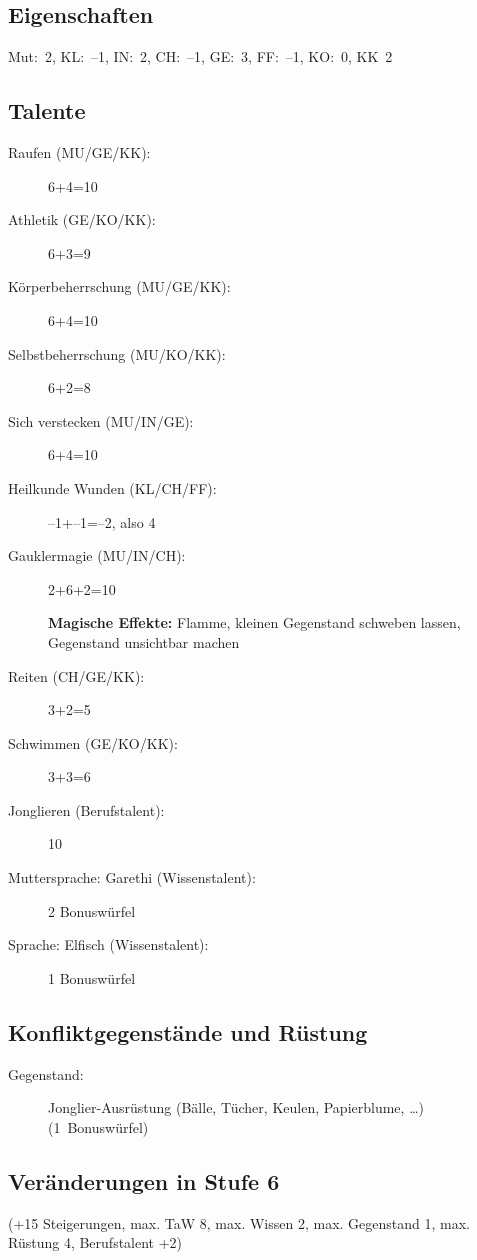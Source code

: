 \subsection{Eigenschaften}
Mut:~2, KL:~--1, IN:~2, CH:~--1, GE:~3, FF:~--1, KO:~0, KK~2

\subsection{Talente}
\begin{description}
\item[Raufen (MU/GE/KK):] 6+4=10
\item[Athletik (GE/KO/KK):] 6+3=9
\item[Körperbeherrschung (MU/GE/KK):] 6+4=10
\item[Selbstbeherrschung (MU/KO/KK):] 6+2=8
\item[Sich verstecken (MU/IN/GE):] 6+4=10
\item[Heilkunde Wunden (KL/CH/FF):] --1+--1=--2, also 4
\item[Gauklermagie (MU/IN/CH):] 2+6+2=10

\textbf{Magische Effekte:} Flamme, kleinen Gegenstand schweben lassen, Gegenstand unsichtbar machen

\item[Reiten (CH/GE/KK):] 3+2=5
\item[Schwimmen (GE/KO/KK):] 3+3=6
\item[Jonglieren (Berufstalent):] 10
\item[Muttersprache: Garethi (Wissenstalent):] 2 Bonuswürfel
\item[Sprache: Elfisch (Wissenstalent):] 1 Bonuswürfel
\end{description}

\subsection{Konfliktgegenstände und Rüstung}
\begin{description}
\item[Gegenstand:] Jonglier-Ausrüstung (Bälle, Tücher, Keulen, Papierblume, \dots) (1~Bonuswürfel)
\end{description}

\subsection{Veränderungen in Stufe 6}
(+15 Steigerungen, max. TaW 8, max. Wissen 2, max. Gegenstand 1, max. Rüstung 4, Berufstalent +2)

